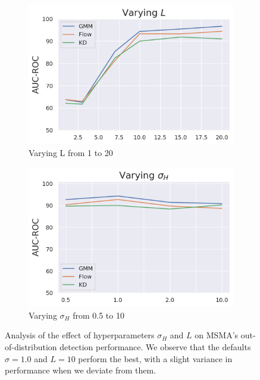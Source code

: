\begin{figure}[tbhp]

\centering
\begin{subfigure}[b]{0.45\textwidth}
\includegraphics[scale=0.5]{figures/L_analysis.png}
\caption{Varying L from 1 to 20}
\label{fig:L_analysis}
\end{subfigure}
\begin{subfigure}[b]{0.45\textwidth}
    \includegraphics[scale=0.5]{figures/sigma_analysis.png}
    \caption{Varying $\sigma_H$ from 0.5 to 10}
    \label{fig:sigma_analysis}
\end{subfigure}
\caption{Analysis of the effect of hyperparameters $\sigma_H$ and $L$ on MSMA's out-of-distribution detection performance. We observe that the defaults $\sigma=1.0$ and $L=10$ perform the best, with a slight variance in performance when we deviate from them.}
\label{fig:analysis}
\end{figure}


